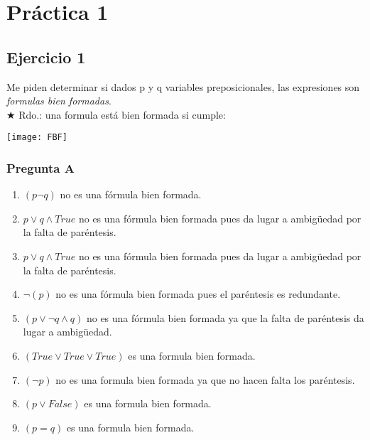 
\usepackage{graphicx}
\usepackage{amsfonts}
\usepackage{enumitem}
\graphicspath{ {images/} }




\maketitle
\newpage

\tableofcontents
\newpage

\section{Práctica 1}

\subsection{Ejercicio 1}

Me piden determinar si dados p y q variables preposicionales, las expresiones son \emph{formulas bien formadas}.\\
$\bigstar$ Rdo.: una formula está bien formada si cumple: 

\texttt{[image: FBF]}

\subsubsection{Pregunta A}
\begin{enumerate}[label=(\alph*)]
    \item $(p \neg q)$ no es una fórmula bien formada.
    \item $p \vee q \wedge True$ no es una fórmula bien formada pues da lugar a ambigüedad por la falta de paréntesis.
    \item $p \vee q \wedge True$ no es una fórmula bien formada pues da lugar a ambigüedad por la falta de paréntesis.
    \item $\neg (p)$ no es una fórmula bien formada pues el paréntesis es redundante.
    \item $(p \vee \neg q \wedge q)$ no es una fórmula bien formada ya que la falta de paréntesis da lugar a ambigüedad.
    \item $(True \vee True \vee True)$ es una formula bien formada.
    \item $(\neg p)$ no es una formula bien formada ya que no hacen falta los paréntesis.
    \item $(p \vee False)$ es una formula bien formada.
    \item $(p = q)$ es una formula bien formada.
\end{enumerate}

